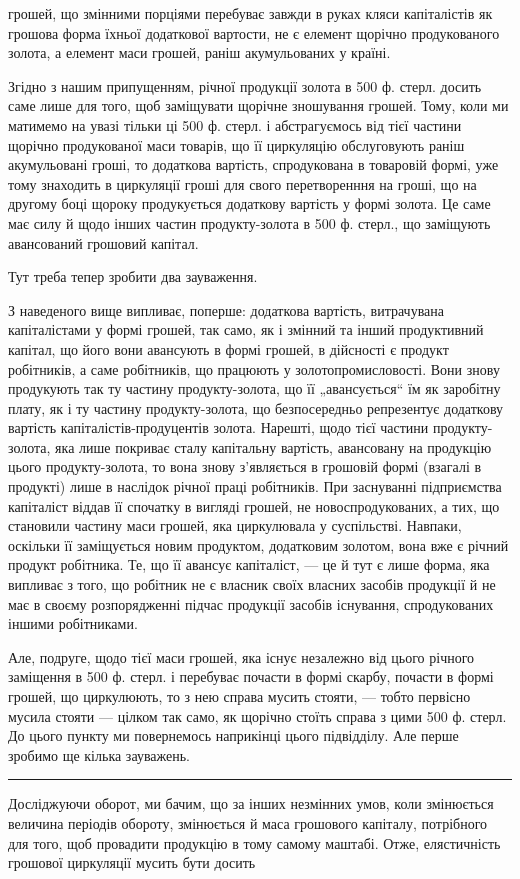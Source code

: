 \parcont{}  %
грошей, що змінними порціями перебуває завжди в руках кляси капіталістів
як грошова форма їхньої додаткової вартости, не є елемент
щорічно продукованого золота, а елемент маси грошей, раніш акумульованих
у країні.

Згідно з нашим припущенням, річної продукції золота в 500 ф. стерл.
досить саме лише для того, щоб заміщувати щорічне зношування грошей.
Тому, коли ми матимемо на увазі тільки ці 500 ф. стерл. і абстрагуємось
від тієї частини щорічно продукованої маси товарів, що її циркуляцію
обслуговують раніш акумульовані гроші, то додаткова вартість, спродукована
в товаровій формі, уже тому знаходить в циркуляції гроші для
свого перетворенння на гроші, що на другому боці щороку продукується
додаткову вартість у формі золота. Це саме має силу й щодо інших частин
продукту-золота в 500 ф. стерл., що заміщують авансований грошовий
капітал.

Тут треба тепер зробити два зауваження.

З наведеного вище випливає, поперше: додаткова вартість, витрачувана
капіталістами у формі грошей, так само, як і змінний та інший
продуктивний капітал, що його вони авансують в формі грошей, в
дійсності є продукт робітників, а саме робітників, що працюють у
золотопромисловості. Вони знову продукують так ту частину продукту-золота,
що її „авансується“ їм як заробітну плату, як і ту частину
продукту-золота, що безпосередньо репрезентує додаткову вартість
капіталістів-продуцентів золота. Нарешті, щодо тієї частини продукту-золота,
яка лише покриває сталу капітальну вартість, авансовану на
продукцію цього продукту-золота, то вона знову з’являється в грошовій
формі (взагалі в продукті) лише в наслідок річної праці робітників.
При заснуванні підприємства капіталіст віддав її спочатку в вигляді
грошей, не новоспродукованих, а тих, що становили частину маси грошей,
яка циркулювала у суспільстві. Навпаки, оскільки її заміщується новим
продуктом, додатковим золотом, вона вже є річний продукт робітника.
Те, що її авансує капіталіст, — це й тут є лише форма, яка випливає з
того, що робітник не є власник своїх власних засобів продукції й не
має в своєму розпорядженні підчас продукції засобів існування, спродукованих
іншими робітниками.

Але, подруге, щодо тієї маси грошей, яка існує незалежно від цього
річного заміщення в 500 ф. стерл. і перебуває почасти в формі скарбу,
почасти в формі грошей, що циркулюють, то з нею справа мусить
стояти, — тобто первісно мусила стояти — цілком так само, як щорічно
стоїть справа з цими 500 ф. стерл. До цього пункту ми повернемось
наприкінці цього підвідділу. Але перше зробимо ще кілька зауважень.

\pfbreak

Досліджуючи оборот, ми бачим, що за інших незмінних умов, коли
змінюється величина періодів обороту, змінюється й маса грошового
капіталу, потрібного для того, щоб провадити продукцію в тому самому
маштабі. Отже, елястичність грошової циркуляції мусить бути досить
\parbreak{}  %
